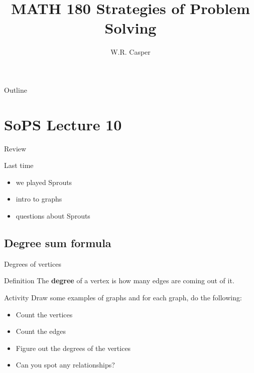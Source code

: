 \documentclass{beamer}
\title{MATH 180 Strategies of Problem Solving}
\subtitle
{} %
\author[W.R. Casper] %
{W.R. Casper}
\institute[California State University Fullerton] %
{
  Department of Mathematics\\
  California State University Fullerton}
\begin{document}
\begin{frame}
  \titlepage
\end{frame}

\begin{frame}{Outline}
  \tableofcontents
\end{frame}



\section{SoPS Lecture 10}

\begin{frame}{Review}
  \begin{block}{Last time}
    \begin{itemize}
\pause
      \item we played Sprouts
      \item intro to graphs
      \item questions about Sprouts
    \end{itemize}
  \end{block}
\end{frame}

\subsection{Degree sum formula}

\begin{frame}{Degrees of vertices}
\pause
  \begin{block}{Definition}
    The \textbf{degree} of a vertex is how many edges are coming out of it.
  \end{block}
\pause
  \begin{block}{Activity}
    Draw some examples of graphs and for each graph, do the following:
    \begin{itemize}
\pause
      \item  Count the vertices
\pause
      \item  Count the edges
\pause
      \item  Figure out the degrees of the vertices
\pause
      \item  Can you spot any relationships?
    \end{itemize}
  \end{block}
\end{frame}
\end{document}
